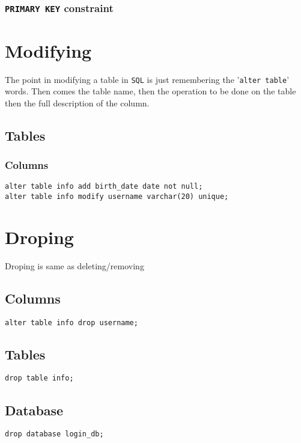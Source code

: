 \documentclass[11pt]{article}
\begin{document}
\subsubsection{\texttt{PRIMARY KEY} constraint}
\label{sec:org2c94931}
\section{Modifying}
\label{sec:org0e2f576}
The point in modifying a table in \texttt{SQL} is just
remembering the '\texttt{alter table}' words. Then comes
the table name, then the operation to be done on
the table then the full description of the column.
\subsection{Tables}
\label{sec:org3a58b08}
\subsubsection{Columns}
\label{sec:orgd875405}
\begin{verbatim}
alter table info add birth_date date not null;
alter table info modify username varchar(20) unique;
\end{verbatim}
\section{Droping}
\label{sec:orgc4e4871}
Droping is same as deleting/removing
\subsection{Columns}
\label{sec:org68564ba}
\begin{verbatim}
alter table info drop username;
\end{verbatim}
\subsection{Tables}
\label{sec:org28a210e}
\begin{verbatim}
drop table info;
\end{verbatim}
\subsection{Database}
\label{sec:org63ef02a}
\begin{verbatim}
drop database login_db;
\end{verbatim}
\end{document}
